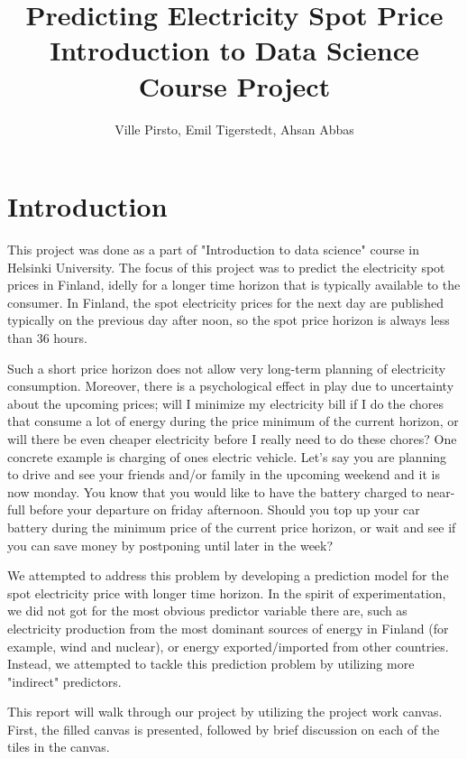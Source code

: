 \documentclass{article}
\title{%
	Predicting Electricity Spot Price\\
	\large Introduction to Data Science Course Project}
\author{Ville Pirsto, Emil Tigerstedt, Ahsan Abbas}
\numberwithin{equation}{section}
\begin{document}
\begin{titlepage}
	\maketitle
	\thispagestyle{empty}
\end{titlepage}

\tableofcontents
\clearpage

\section{Introduction}
This project was done as a part of "Introduction to data science" course in Helsinki University. The focus of this project was to predict the electricity spot prices in Finland, idelly for a longer time horizon that is typically available to the consumer. In Finland, the spot electricity prices for the next day are published typically on the previous day after noon, so the spot price horizon is always less than 36 hours. 

Such a short price horizon does not allow very long-term planning of electricity consumption. Moreover, there is a psychological effect in play due to uncertainty about the upcoming prices; will I minimize my electricity bill if I do the chores that consume a lot of energy during the price minimum of the current horizon, or will there be even cheaper electricity before I really need to do these chores? One concrete example is charging of ones electric vehicle. Let's say you are planning to drive and see your friends and/or family in the upcoming weekend and it is now monday. You know that you would like to have the battery charged to near-full before your departure on friday afternoon. Should you top up your car battery during the minimum price of the current price horizon, or wait and see if you can save money by postponing until later in the week?

We attempted to address this problem by developing a prediction model for the spot electricity price with longer time horizon. In the spirit of experimentation, we did not got for the most obvious predictor variable there are, such as electricity production from the most dominant sources of energy in Finland (for example, wind and nuclear), or energy exported/imported from other countries. Instead, we attempted to tackle this prediction problem by utilizing more "indirect" predictors.

This report will walk through our project by utilizing the project work canvas. First, the filled canvas is presented, followed by brief discussion on each of the tiles in the canvas.
\end{document}
